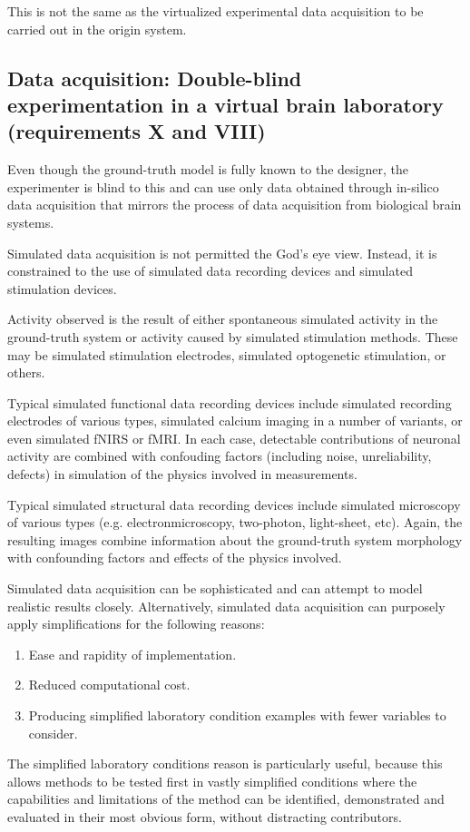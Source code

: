 \documentclass{ldr-article}
\begin{document}
This is not the same as the virtualized experimental data acquisition to be carried out in the origin system.

\subsection{Data acquisition: Double-blind experimentation in a virtual brain laboratory (requirements X and VIII)}

Even though the ground-truth model is fully known to the designer, the experimenter is blind to this and can use only data obtained through in-silico data acquisition that mirrors the process of data acquisition from biological brain systems.

Simulated data acquisition is not permitted the God's eye view. Instead, it is constrained to the use of simulated data recording devices and simulated stimulation devices.

Activity observed is the result of either spontaneous simulated activity in the ground-truth system or activity caused by simulated stimulation methods. These may be simulated stimulation electrodes, simulated optogenetic stimulation, or others.

Typical simulated functional data recording devices include simulated recording electrodes of various types, simulated calcium imaging in a number of variants, or even simulated fNIRS or fMRI. In each case, detectable contributions of neuronal activity are combined with confouding factors (including noise, unreliability, defects) in simulation of the physics involved in measurements.

Typical simulated structural data recording devices include simulated microscopy of various types (e.g. electronmicroscopy, two-photon, light-sheet, etc). Again, the resulting images combine information about the ground-truth system morphology with confounding factors and effects of the physics involved.

Simulated data acquisition can be sophisticated and can attempt to model realistic results closely. Alternatively, simulated data acquisition can purposely apply simplifications for the following reasons:
\begin{enumerate}
	\item Ease and rapidity of implementation.
	\item Reduced computational cost.
	\item Producing simplified laboratory condition examples with fewer variables to consider.
\end{enumerate}
The simplified laboratory conditions reason is particularly useful, because this allows methods to be tested first in vastly simplified conditions where the capabilities and limitations of the method can be identified, demonstrated and evaluated in their most obvious form, without distracting contributors.
\end{document}
